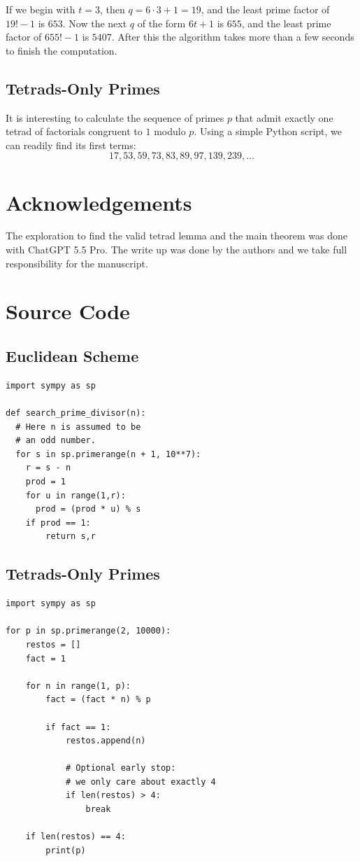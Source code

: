 \documentclass[12pt]{amsart}
\theoremstyle{remark}
\begin{document}
If we begin with $t=3$, then $q=6\cdot 3 +1 = 19$, and the least prime factor of $19!-1$ is $653$. Now the next $q$ of the form $6t+1$ is $655$, and the least prime factor of $655!-1$ is $5407$. After this the algorithm takes more than a few seconds to finish the computation.

\subsection{Tetrads-Only Primes}

It is interesting to calculate the sequence of primes $p$ that admit exactly one tetrad of factorials congruent to $1$ modulo $p$. Using a simple Python script, we can readily find its first terms:
\[
17, 53, 59, 73, 83, 89, 97, 139, 239, \ldots
\]


\section*{Acknowledgements}

The exploration to find the valid tetrad lemma and the main theorem was done with ChatGPT
5.5 Pro. The write up was done by the authors and we take full responsibility for the manuscript.

\section*{Source Code}
\subsection{Euclidean Scheme}
\begin{verbatim}
import sympy as sp

def search_prime_divisor(n):
  # Here n is assumed to be
  # an odd number.
  for s in sp.primerange(n + 1, 10**7):
    r = s - n
    prod = 1
    for u in range(1,r):
      prod = (prod * u) % s
    if prod == 1:
        return s,r
\end{verbatim}

\subsection{Tetrads-Only Primes}

\begin{verbatim}
import sympy as sp

for p in sp.primerange(2, 10000):
    restos = []
    fact = 1

    for n in range(1, p):
        fact = (fact * n) % p

        if fact == 1:
            restos.append(n)

            # Optional early stop:
            # we only care about exactly 4
            if len(restos) > 4:
                break

    if len(restos) == 4:
        print(p)
\end{verbatim}
%
%
\printbibliography
\end{document}
